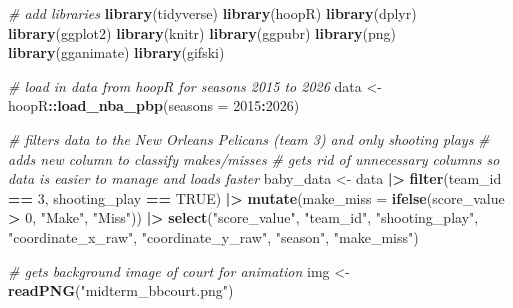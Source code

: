 \documentclass[
]{article}
\newenvironment{Shaded}{\begin{snugshade}}{\end{snugshade}}
\newcommand{\AttributeTok}[1]{\textcolor[rgb]{0.13,0.29,0.53}{#1}}
\newcommand{\CommentTok}[1]{\textcolor[rgb]{0.56,0.35,0.01}{\textit{#1}}}
\newcommand{\ConstantTok}[1]{\textcolor[rgb]{0.56,0.35,0.01}{#1}}
\newcommand{\DecValTok}[1]{\textcolor[rgb]{0.00,0.00,0.81}{#1}}
\newcommand{\FunctionTok}[1]{\textcolor[rgb]{0.13,0.29,0.53}{\textbf{#1}}}
\newcommand{\NormalTok}[1]{#1}
\newcommand{\OtherTok}[1]{\textcolor[rgb]{0.56,0.35,0.01}{#1}}
\newcommand{\SpecialCharTok}[1]{\textcolor[rgb]{0.81,0.36,0.00}{\textbf{#1}}}
\newcommand{\StringTok}[1]{\textcolor[rgb]{0.31,0.60,0.02}{#1}}
\begin{document}
\begin{Shaded}
\begin{Highlighting}[]
\CommentTok{\# add libraries}
\FunctionTok{library}\NormalTok{(tidyverse)}
\FunctionTok{library}\NormalTok{(hoopR)}
\FunctionTok{library}\NormalTok{(dplyr)}
\FunctionTok{library}\NormalTok{(ggplot2)}
\FunctionTok{library}\NormalTok{(knitr)}
\FunctionTok{library}\NormalTok{(ggpubr)}
\FunctionTok{library}\NormalTok{(png)}
\FunctionTok{library}\NormalTok{(gganimate)}
\FunctionTok{library}\NormalTok{(gifski)}

\CommentTok{\# load in data from hoopR for seasons 2015 to 2026}
\NormalTok{data }\OtherTok{\textless{}{-}}\NormalTok{ hoopR}\SpecialCharTok{::}\FunctionTok{load\_nba\_pbp}\NormalTok{(}\AttributeTok{seasons =} \DecValTok{2015}\SpecialCharTok{:}\DecValTok{2026}\NormalTok{)}

\CommentTok{\# filters data to the New Orleans Pelicans (team 3) and only shooting plays}
\CommentTok{\# adds new column to classify makes/misses}
\CommentTok{\# gets rid of unnecessary columns so data is easier to manage and loads faster}
\NormalTok{baby\_data }\OtherTok{\textless{}{-}}\NormalTok{ data }\SpecialCharTok{|\textgreater{}} 
  \FunctionTok{filter}\NormalTok{(team\_id }\SpecialCharTok{==} \DecValTok{3}\NormalTok{, shooting\_play }\SpecialCharTok{==} \ConstantTok{TRUE}\NormalTok{) }\SpecialCharTok{|\textgreater{}} 
  \FunctionTok{mutate}\NormalTok{(}\AttributeTok{make\_miss =} \FunctionTok{ifelse}\NormalTok{(score\_value }\SpecialCharTok{\textgreater{}} \DecValTok{0}\NormalTok{, }\StringTok{"Make"}\NormalTok{, }\StringTok{"Miss"}\NormalTok{)) }\SpecialCharTok{|\textgreater{}} 
  \FunctionTok{select}\NormalTok{(}\StringTok{"score\_value"}\NormalTok{, }\StringTok{"team\_id"}\NormalTok{, }\StringTok{"shooting\_play"}\NormalTok{, }\StringTok{"coordinate\_x\_raw"}\NormalTok{, }\StringTok{"coordinate\_y\_raw"}\NormalTok{, }\StringTok{"season"}\NormalTok{, }\StringTok{"make\_miss"}\NormalTok{)}

\CommentTok{\# gets background image of court for animation}
\NormalTok{img }\OtherTok{\textless{}{-}} \FunctionTok{readPNG}\NormalTok{(}\StringTok{"midterm\_bbcourt.png"}\NormalTok{)}


\end{Highlighting}
\end{Shaded}
\end{document}

